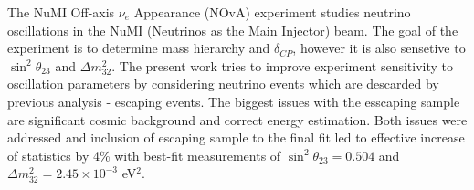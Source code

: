 
The NuMI Off-axis $\nu_e$ Appearance (NOvA) experiment studies neutrino oscillations 
in the NuMI (Neutrinos as the Main Injector) beam. The goal of the experiment is to determine 
mass hierarchy and $\delta_{CP}$, however it is also sensetive to $\sin^2\theta_{23}$ and
$\Delta m_{32}^2$. The present work tries to improve experiment sensitivity to oscillation
parameters by considering neutrino events which are descarded by previous analysis - escaping events.
The biggest issues with the esscaping sample are significant cosmic background and correct
energy estimation. Both issues were addressed and inclusion of escaping sample to the final 
fit led to effective increase of statistics by 4\% with best-fit measurements of 
$\sin^2\theta_{23} = 0.504$ and $\Delta m_{32}^2 = 2.45 \times 10^{-3}$ eV$^2$.

